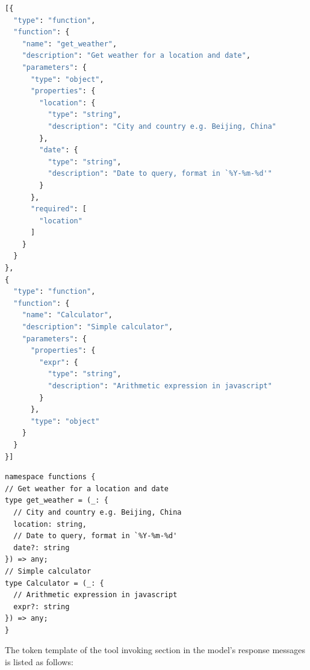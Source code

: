 \begin{lstlisting}[language=Python, caption=Tool definition with JSON in OpenAI compatible API, label={lst:tool-declare-json}]
[{
  "type": "function",
  "function": {
    "name": "get_weather",
    "description": "Get weather for a location and date",
    "parameters": {
      "type": "object",
      "properties": {
        "location": {
          "type": "string",
          "description": "City and country e.g. Beijing, China"
        },
        "date": {
          "type": "string",
          "description": "Date to query, format in `%Y-%m-%d'"
        }
      },
      "required": [
        "location"
      ]
    }
  }
},
{
  "type": "function",
  "function": {
    "name": "Calculator",
    "description": "Simple calculator",
    "parameters": {
      "properties": {
        "expr": {
          "type": "string",
          "description": "Arithmetic expression in javascript"
        }
      },
      "type": "object"
    }
  }
}]
\end{lstlisting}

\begin{lstlisting}[caption=Tool definition in TypeScript, label={lst:tool-declare-ts}]
namespace functions { 
// Get weather for a location and date
type get_weather = (_: { 
  // City and country e.g. Beijing, China 
  location: string, 
  // Date to query, format in `%Y-%m-%d' 
  date?: string 
}) => any; 
// Simple calculator 
type Calculator = (_: { 
  // Arithmetic expression in javascript 
  expr?: string 
}) => any; 
}
\end{lstlisting}


The token template of the tool invoking section in the model's response messages is listed as follows:
\begin{center}
\end{center}

